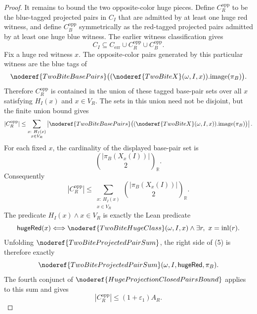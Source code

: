 \begin{proof}
It remains to bound the two opposite-color huge pieces.  Define
\(C_R^{\mathrm{opp}}\) to be the blue-tagged projected pairs in \(C_I\) that
are admitted by at least one huge red witness, and define
\(C_B^{\mathrm{opp}}\) symmetrically as the red-tagged projected pairs
admitted by at least one huge blue witness.  The earlier witness
classification gives
\[
C_I\subseteq
C_{\mathrm{err}}\cup C_R^{\mathrm{opp}}\cup C_B^{\mathrm{opp}}. \tag{4}
\]
Fix a huge red witness \(x\).  The opposite-color pairs generated by this
particular witness are the blue tags of
\[
\noderef{TwoBiteBasePairs}
\bigl((\noderef{TwoBiteX}(\omega,I,x)).\mathrm{image}(\pi_B)\bigr).
\]
Therefore \(C_R^{\mathrm{opp}}\) is contained in the union of these tagged
base-pair sets over all \(x\) satisfying \(H_I(x)\) and \(x\in V_R\).  The
sets in this union need not be disjoint, but the finite union bound gives
\[
|C_R^{\mathrm{opp}}|
\le
\sum_{\substack{x:\ H_I(x)\\ x\in V_R}}
  \left|
  \noderef{TwoBiteBasePairs}
  \bigl((\noderef{TwoBiteX}(\omega,I,x)).\mathrm{image}(\pi_B)\bigr)
  \right|.
\]
For each fixed \(x\), the cardinality of the displayed base-pair set is
\[
\binom{|\pi_B(X_x(I))|}{2}_{\mathbb R}.
\]
Consequently
\[
|C_R^{\mathrm{opp}}|
\le
\sum_{\substack{x:\ H_I(x)\\ x\in V_R}}
  \binom{|\pi_B(X_x(I))|}{2}_{\mathbb R}. \tag{5}
\]
The predicate \(H_I(x)\land x\in V_R\) is exactly the Lean predicate
\[
\mathsf{hugeRed}(x)\Longleftrightarrow
\noderef{TwoBiteHugeClass}(\omega,I,x)\land
\exists r,\ x=\operatorname{inl}(r).
\]
Unfolding \(\noderef{TwoBiteProjectedPairSum}\), the right side of (5) is
therefore exactly
\[
\noderef{TwoBiteProjectedPairSum}(\omega,I,\mathsf{hugeRed},\pi_B).
\]
The fourth conjunct of \(\noderef{HugeProjectionClosedPairsBound}\) applies
to this sum and gives
\[
|C_R^{\mathrm{opp}}|\le (1+\varepsilon_1)A_R. \tag{6}
\]


\end{proof}
